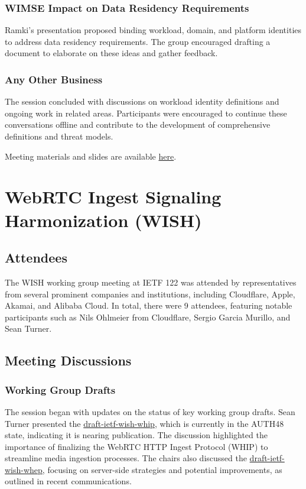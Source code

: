 \documentclass{article}
\begin{document}
\subsubsection{WIMSE Impact on Data Residency Requirements}
Ramki's presentation proposed binding workload, domain, and platform identities to address data residency requirements. The group encouraged drafting a document to elaborate on these ideas and gather feedback.

\subsubsection{Any Other Business}
The session concluded with discussions on workload identity definitions and ongoing work in related areas. Participants were encouraged to continue these conversations offline and contribute to the development of comprehensive definitions and threat models.

Meeting materials and slides are available \href{https://datatracker.ietf.org/meeting/122/materials/slides-122-wimse-wimse-architecture-00.pdf}{here}.



\newpage

\section{WebRTC Ingest Signaling Harmonization (WISH)}

\subsection{Attendees}
The WISH working group meeting at IETF 122 was attended by representatives from several prominent companies and institutions, including Cloudflare, Apple, Akamai, and Alibaba Cloud. In total, there were 9 attendees, featuring notable participants such as Nils Ohlmeier from Cloudflare, Sergio Garcia Murillo, and Sean Turner.

\subsection{Meeting Discussions}

\subsubsection{Working Group Drafts}
The session began with updates on the status of key working group drafts. Sean Turner presented the \href{https://datatracker.ietf.org/doc/html/draft-ietf-wish-whip}{draft-ietf-wish-whip}, which is currently in the AUTH48 state, indicating it is nearing publication. The discussion highlighted the importance of finalizing the WebRTC HTTP Ingest Protocol (WHIP) to streamline media ingestion processes. The chairs also discussed the \href{https://datatracker.ietf.org/doc/html/draft-ietf-wish-whep}{draft-ietf-wish-whep}, focusing on server-side strategies and potential improvements, as outlined in recent communications.
\end{document}
